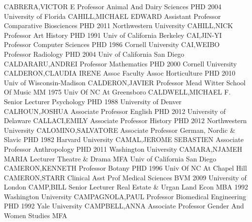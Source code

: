 \documentclass[
]{article}
\begin{document}
CABRERA,VICTOR E \textbar Professor \textbar{} 
\textbar Animal And Dairy Sciences \textbar PHD 2004 University of
Florida \textbar CAHILL,MICHAEL EDWARD \textbar Assistant Professor
\textbar{}  \textbar Comparative Biosciences \textbar PHD
2011 Northwestern University \textbar CAHILL,NICK \textbar Professor
\textbar{}  \textbar Art History \textbar PHD 1991 Univ of
California Berkeley \textbar CAI,JIN-YI \textbar Professor \textbar{}
 \textbar Computer Sciences \textbar PHD 1986 Cornell
University \textbar CAI,WEIBO \textbar Professor \textbar{} 
\textbar Radiology \textbar PHD 2004 Univ of California San Diego
\textbar CALDARARU,ANDREI \textbar Professor \textbar{} 
\textbar Mathematics \textbar PHD 2000 Cornell University
\textbar CALDERON,CLAUDIA IRENE \textbar Assoc Faculty Assoc \textbar{}
 \textbar Horticulture \textbar PHD 2010 Univ of
Wisconsin-Madison \textbar CALDERON,JAVIER \textbar Professor \textbar{}
 \textbar Mead Witter School Of Music \textbar MM 1975 Univ
Of NC At Greensboro \textbar CALDWELL,MICHAEL F. \textbar Senior
Lecturer \textbar{}  \textbar Psychology \textbar PHD 1988
University of Denver \textbar CALHOUN,JOSHUA \textbar Associate
Professor \textbar{}  \textbar English \textbar PHD 2012
University of Delaware \textbar CALLACI,EMILY \textbar Associate
Professor \textbar{}  \textbar History \textbar PHD 2012
Northwestern University \textbar CALOMINO,SALVATORE \textbar Associate
Professor \textbar{}  \textbar German, Nordic \& Slavic
\textbar PHD 1982 Harvard University \textbar CAMAL,JEROME SEBASTIEN
\textbar Associate Professor \textbar{} 
\textbar Anthropology \textbar PHD 2011 Washington University
\textbar CAMARA,NJAMEH MARIA \textbar Lecturer \textbar{} 
\textbar Theatre \& Drama \textbar MFA Univ of California San Diego
\textbar CAMERON,KENNETH \textbar Professor \textbar{} 
\textbar Botany \textbar PHD 1996 Univ Of NC At Chapel Hill
\textbar CAMERON,STARR \textbar Clinical Asst Prof \textbar{}
 \textbar Medical Sciences \textbar BVM 2009 University of
London \textbar CAMP,BILL \textbar Senior Lecturer \textbar{}
 \textbar Real Estate \& Urgan Land Econ \textbar MBA 1992
Washington University \textbar CAMPAGNOLA,PAUL \textbar Professor
\textbar{}  \textbar Biomedical Engineering \textbar PHD 1992
Yale University \textbar CAMPBELL,ANNA \textbar Associate Professor
\textbar{}  \textbar Gender And Women Studies \textbar MFA
\end{document}
